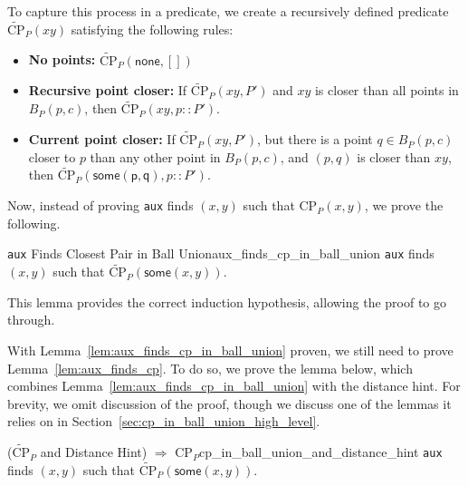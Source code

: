 \documentclass{article}
\begin{document}
To capture this process in a predicate, we create a recursively defined predicate $\widetilde{\text{CP}}_P(x\!y)$ satisfying the following rules:
\begin{itemize}
  \item \textbf{No points:} $\widetilde{\text{CP}}_P(\mathsf{none}, [])$
  \label{case:rec_pt_closer}
  \item \textbf{Recursive point closer:} If $\widetilde{\text{CP}}_P(x\!y, P')$ and $x\!y$ is closer than all points in $B_P(p, c)$, then $\widetilde{\text{CP}}_P(x\!y, p :: P')$.
  \label{case:curr_pt_closer}
  \item \textbf{Current point closer:} If $\widetilde{\text{CP}}_P(x\!y, P')$, but there is a point $q \in B_P(p, c)$ closer to $p$ than any other point in $B_P(p, c)$, and $(p, q)$ is closer than $x\!y$, then $\widetilde{\text{CP}}_P(\mathsf{some(p, q)}, p :: P')$.
\end{itemize}
Now, instead of proving \texttt{aux} finds $(x, y)$ such that $\text{CP}_P(x, y)$, we prove the following.

\begin{tcblemma}{{\large\texttt{aux}} Finds Closest Pair in Ball Union}{aux_finds_cp_in_ball_union}
\texttt{aux} finds $(x, y)$ such that $\widetilde{\text{CP}}_P(\mathsf{some}(x, y))$.
\end{tcblemma}
This lemma provides the correct induction hypothesis, allowing the proof to go through.

With Lemma~\ref{lem:aux_finds_cp_in_ball_union} proven, we still need to prove Lemma~\ref{lem:aux_finds_cp}.
To do so, we prove the lemma below, which combines Lemma~\ref{lem:aux_finds_cp_in_ball_union} with the distance hint.
For brevity, we omit discussion of the proof, though we discuss one of the lemmas it relies on in Section~\ref{sec:cp_in_ball_union_high_level}.

\begin{tcblemma}{($\widetilde{\text{CP}}_P$ and Distance Hint) $\Rightarrow$ $\text{CP}_P$}{cp_in_ball_union_and_distance_hint}
\texttt{aux} finds $(x, y)$ such that $\widetilde{\text{CP}}_P(\mathsf{some}(x, y))$.
\end{tcblemma}


\end{document}
